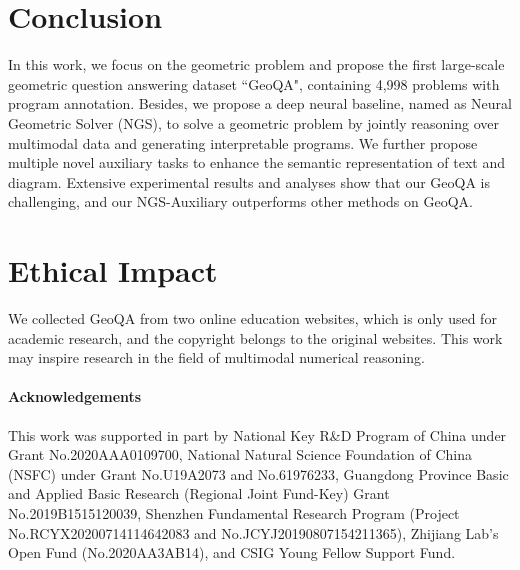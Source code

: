 \documentclass[11pt,a4paper]{article}
\begin{document}
\section{Conclusion}
In this work, we focus on the geometric problem and propose the first large-scale geometric question answering dataset ``GeoQA", containing 4,998 problems with program annotation. Besides, we propose a deep neural baseline, named as Neural Geometric Solver (NGS), to solve a geometric problem by jointly reasoning over multimodal data and generating interpretable programs. We further propose multiple novel auxiliary tasks to enhance the semantic representation of text and diagram. 
Extensive experimental results and analyses show that our GeoQA is challenging, and our NGS-Auxiliary outperforms other methods on GeoQA.

\section{Ethical Impact}
We collected GeoQA from two online education websites, which is only used for academic research, and the copyright belongs to the original websites. This work may inspire research in the field of multimodal numerical reasoning.

\paragraph{Acknowledgements}
This work was supported in part by National Key R\&D Program of China under Grant No.2020AAA0109700, National Natural Science Foundation of China (NSFC) under Grant No.U19A2073 and No.61976233, Guangdong Province Basic and Applied Basic Research (Regional Joint Fund-Key) Grant No.2019B1515120039,  Shenzhen Fundamental Research Program (Project No.RCYX20200714114642083 and No.JCYJ20190807154211365), Zhijiang Lab’s Open Fund (No.2020AA3AB14), and CSIG Young Fellow Support Fund.








\end{document}

